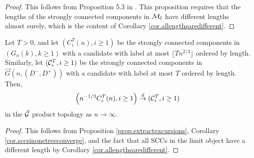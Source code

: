\begin{proof}
This follows from Proposition 5.3 in \cite{goldschmidtScalingLimitCritical2019}. This proposition requires that the lengths of the strongly connected components in ${\mathcal M}_{l}$ have different lengths almost surely, which is the content of Corollary \ref{cor.allengthsaredifferent}. 
\end{proof}

\begin{corollary}\label{cor.sccordereduptotimeT}
Let $T>0$, and let $(C^T_i(n),i\geq 1)$ be the strongly connected components in $(G_n(k),k\geq 1)$ with a candidate with label at most $\lfloor T n^{2/3}\rfloor$ ordered by length. Similarly, let $({\mathcal C}^T_i,i\geq 1)$ be the strongly connected components in $\vec{G}(n,(D^-,D^+))$ with a candidate with label at most $T$ ordered by length. Then,
$$\left(n^{-1/3}C^T_i(n), i\geq 1\right) \overset{d}{\to} ({\mathcal C}^T_i,i\geq 1)$$
in the $\vec{{\mathcal G}}$ product topology as $n\to \infty$. 
\end{corollary}
\begin{proof}
This follows from Proposition \ref{prop.extractexcursions}, Corollary \ref{cor.sccsinonetreeconverge}, and the fact that all SCCs in the limit object have a different length by Corollary \ref{cor.allengthsaredifferent}. 
\end{proof}

